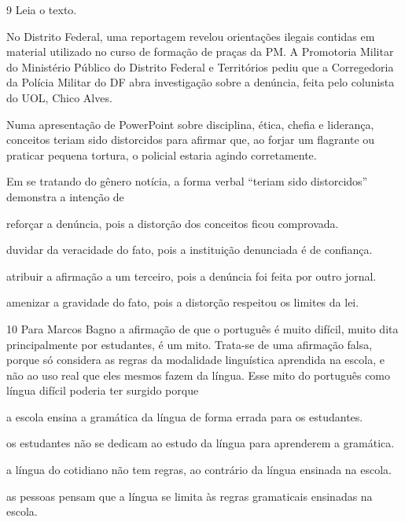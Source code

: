 \num{9} Leia o texto.

\begin{myquote}
No Distrito Federal, uma reportagem revelou orientações ilegais contidas
em material utilizado no curso de formação de praças da PM. A Promotoria
Militar do Ministério Público do Distrito Federal e Territórios pediu
que a Corregedoria da Polícia Militar do DF abra investigação sobre a
denúncia, feita pelo colunista do UOL, Chico Alves.

Numa apresentação de PowerPoint sobre disciplina, ética, chefia e
liderança, conceitos teriam sido distorcidos para afirmar que, ao forjar
um flagrante ou praticar pequena tortura, o policial estaria agindo
corretamente.

\end{myquote}

\pagebreak

Em se tratando do gênero notícia, a forma verbal ``teriam sido
distorcidos'' demonstra a intenção de

\begin{escolha}
\item reforçar a denúncia, pois a distorção dos conceitos ficou comprovada.

\item duvidar da veracidade do fato, pois a instituição denunciada é de confiança.

\item atribuir a afirmação a um terceiro, pois a denúncia foi feita por outro jornal.

\item amenizar a gravidade do fato, pois a distorção respeitou os limites da lei.
\end{escolha}

\num{10} Para Marcos Bagno a afirmação de que o português é muito difícil,
muito dita principalmente por estudantes, é um mito. Trata-se de uma afirmação
falsa, porque só considera as regras da modalidade linguística aprendida na
escola, e não ao uso real que eles mesmos fazem da língua. Esse 
mito do português como língua difícil poderia ter surgido porque

\begin{escolha}
\item a escola ensina a gramática da língua de forma errada para os
estudantes.

\item os estudantes não se dedicam ao estudo da língua para aprenderem a
gramática.

\item a língua do cotidiano não tem regras, ao contrário da língua ensinada
na escola.

\item as pessoas pensam que a língua se limita às regras gramaticais ensinadas na escola.
\end{escolha}


